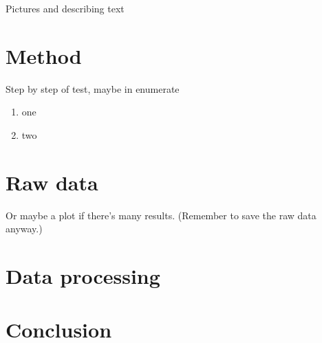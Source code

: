 Pictures and describing text
\section*{Method}
Step by step of test, maybe in enumerate
\begin{enumerate}
\item one
\item two
\end{enumerate}
\section*{Raw data}
Or maybe a plot if there's many results. (Remember to save the raw data anyway.)
\section*{Data processing}
\section*{Conclusion}


